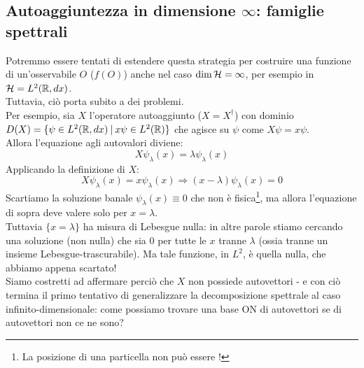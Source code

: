 \documentclass[../../FisicaTeorica.tex]{subfiles}
\begin{document}
\subsection{Autoaggiuntezza in dimensione $\infty$: famiglie spettrali}
Potremmo essere tentati di estendere questa strategia per costruire una funzione di un'osservabile $O$ ($f(O)$) anche nel caso $\operatorname{dim}\mathcal{H} = \infty$, per esempio in $\mathcal{H} = L^2(\mathbb{R}, dx)$.\\
Tuttavia, ciò porta subito a dei problemi.\\
Per esempio, sia $X$ l'operatore autoaggiunto ($X=X^\dag$) con dominio $D(X) = \{\psi \in L^2(\mathbb{R}, dx)\>|\>x\psi \in L^2(\mathbb{R})\}$ che agisce su $\psi$ come $X\psi = x\psi$.\\
Allora l'equazione agli autovalori diviene:
\[
X\psi_\lambda (x) = \lambda \psi_\lambda (x)
\]
Applicando la definizione di $X$:
\[
X\psi_\lambda(x) = x\psi_\lambda(x) \Rightarrow (x-\lambda)\psi_\lambda (x) = 0
\]
Scartiamo la soluzione banale $\psi_\lambda(x) \equiv 0$ che non è fisica\footnote{La posizione di una particella non può essere !}, ma allora l'equazione di sopra deve valere solo per $x = \lambda$.\\
Tuttavia $\{x = \lambda \}$ ha misura di Lebesgue nulla: in altre parole stiamo cercando una soluzione (non nulla) che sia $0$ per tutte le $x$ tranne $\lambda$ (ossia tranne un insieme Lebesgue-trascurabile). Ma tale funzione, in $L^2$, è quella nulla, che abbiamo appena scartato!\\
Siamo costretti ad affermare perciò che $X$ non possiede autovettori - e con ciò termina il primo tentativo di generalizzare la decomposizione spettrale al caso infinito-dimensionale: come possiamo trovare una base ON di autovettori se di autovettori non ce ne sono?\\
\end{document}
